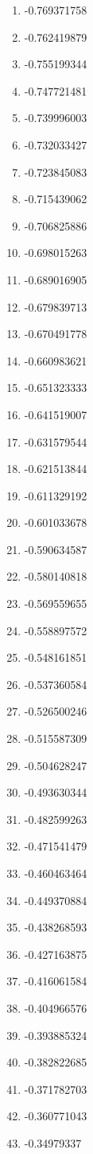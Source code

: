 \documentclass[6pt]{article}
\begin{document}
\begin{multicols}{4}
\begin{enumerate}
		\item -0.769371758
		\item -0.762419879
		\item -0.755199344
		\item -0.747721481
		\item -0.739996003
		\item -0.732033427
		\item -0.723845083
		\item -0.715439062
		\item -0.706825886
		\item -0.698015263
		\item -0.689016905
		\item -0.679839713
		\item -0.670491778
		\item -0.660983621
		\item -0.651323333
		\item -0.641519007
		\item -0.631579544
		\item -0.621513844
		\item -0.611329192
		\item -0.601033678
		\item -0.590634587
		\item -0.580140818
		\item -0.569559655
		\item -0.558897572
		\item -0.548161851
		\item -0.537360584
		\item -0.526500246
		\item -0.515587309
		\item -0.504628247
		\item -0.493630344
		\item -0.482599263
		\item -0.471541479
		\item -0.460463464
		\item -0.449370884
		\item -0.438268593
		\item -0.427163875
		\item -0.416061584
		\item -0.404966576
		\item -0.393885324
		\item -0.382822685
		\item -0.371782703
		\item -0.360771043
		\item -0.34979337

\end{enumerate}
\end{multicols}
\end{document}
